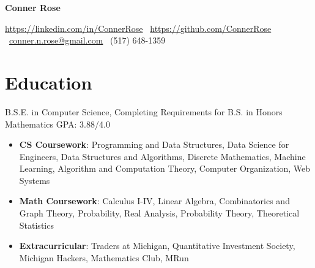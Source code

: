 \documentclass[letterpaper,11pt]{article}
\begin{document}
\begin{center}
    \Huge{\textbf{Conner Rose}} \\
    \small
    \begin{center}
        \href{https://linkedin.com/in/ConnerRose}{https://linkedin.com/in/ConnerRose}
        \ \href{https://github.com/ConnerRose}{https://github.com/ConnerRose}
        \ \href{mailto:conner.n.rose@gmail.com}{conner.n.rose@gmail.com}
        \ (517) 648-1359
    \end{center}
\end{center}

\section{Education}
{B.S.E. in Computer Science, Completing Requirements for B.S. in Honors Mathematics}
{GPA: 3.88/4.0}
\begin{itemize}[leftmargin=*]
    \item \vspace{-5pt} \small \textbf{CS Coursework}:
          Programming and Data Structures, Data Science for Engineers,
          Data Structures and Algorithms, Discrete Mathematics,
          Machine Learning, Algorithm and Computation Theory,
          Computer Organization, Web Systems
    \item \vspace{-7pt} \small \textbf{Math Coursework}:
          Calculus I-IV, Linear Algebra, Combinatorics and Graph Theory,
          Probability, Real Analysis, Probability Theory,
          Theoretical Statistics
    \item \vspace{-7pt} \small \textbf{Extracurricular}:
          Traders at Michigan, Quantitative Investment Society, Michigan
          Hackers, Mathematics Club, MRun
\end{itemize}
\end{document}
